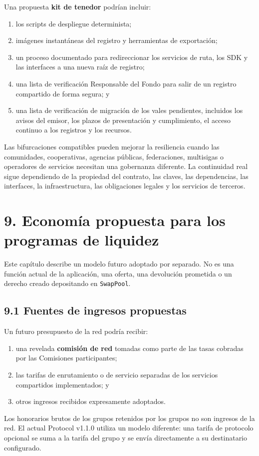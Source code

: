 \documentclass[11pt]{article}
\begin{document}
Una propuesta \textbf{kit de tenedor} podrían incluir:

\begin{enumerate}[leftmargin=*]
\item los scripts de despliegue determinista;
\item imágenes instantáneas del registro y herramientas de exportación;
\item un proceso documentado para redireccionar los servicios de ruta, los SDK y las interfaces a una nueva raíz de registro;
\item una lista de verificación Responsable del Fondo para salir de un registro compartido de forma segura; y
\item una lista de verificación de migración de los vales pendientes, incluidos los avisos del emisor, los plazos de presentación y cumplimiento, el acceso continuo a los registros y los recursos.
\end{enumerate}
Las bifurcaciones compatibles pueden mejorar la resiliencia cuando las comunidades, cooperativas, agencias públicas, federaciones, multisigas o operadores de servicios necesitan una gobernanza diferente. La continuidad real sigue dependiendo de la propiedad del contrato, las claves, las dependencias, las interfaces, la infraestructura, las obligaciones legales y los servicios de terceros.


\section*{9. Economía propuesta para los programas de liquidez}

Este capítulo describe un modelo futuro adoptado por separado. No es una función actual de la aplicación, una oferta, una devolución prometida o un derecho creado depositando en \texttt{SwapPool}.

\subsection*{9.1 Fuentes de ingresos propuestas}

Un futuro presupuesto de la red podría recibir:

\begin{enumerate}[leftmargin=*]
\item una revelada \textbf{comisión de red} tomadas como parte de las tasas cobradas por las Comisiones participantes;
\item las tarifas de enrutamiento o de servicio separadas de los servicios compartidos implementados; y
\item otros ingresos recibidos expresamente adoptados.
\end{enumerate}
Los honorarios brutos de los grupos retenidos por los grupos no son ingresos de la red. El actual Protocol v1.1.0 utiliza un modelo diferente: una tarifa de protocolo opcional se suma a la tarifa del grupo y se envía directamente a su destinatario configurado.
\end{document}
